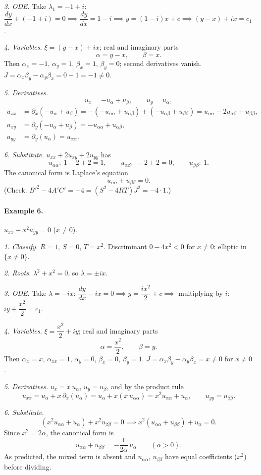 \documentclass[11pt]{article}
\theoremstyle{plain}
\theoremstyle{definition}
\theoremstyle{remark}
\begin{document}
\emph{3. ODE.} Take $\lambda_1 = -1 + i$: $\dfrac{dy}{dx} + (-1 + i) = 0 \implies \dfrac{dy}{dx} = 1 - i \implies y = (1 - i)x + c \implies (y - x) + ix = c_1$.

\emph{4. Variables.} $\xi = (y - x) + ix$; real and imaginary parts
$$ \alpha = y - x, \qquad \beta = x. $$
Then $\alpha_x = -1$, $\alpha_y = 1$, $\beta_x = 1$, $\beta_y = 0$; second derivatives vanish. $J = \alpha_x\beta_y - \alpha_y\beta_x = 0 - 1 = -1 \neq 0$.

\emph{5. Derivatives.}
$$ u_x = -u_\alpha + u_\beta, \qquad u_y = u_\alpha, $$
\begin{align*}
u_{xx} &= \partial_x(-u_\alpha + u_\beta) = -(-u_{\alpha\alpha} + u_{\alpha\beta}) + (-u_{\alpha\beta} + u_{\beta\beta}) = u_{\alpha\alpha} - 2u_{\alpha\beta} + u_{\beta\beta}, \\
u_{xy} &= \partial_y(-u_\alpha + u_\beta) = -u_{\alpha\alpha} + u_{\alpha\beta}, \\
u_{yy} &= \partial_y(u_\alpha) = u_{\alpha\alpha}.
\end{align*}

\emph{6. Substitute.} $u_{xx} + 2u_{xy} + 2u_{yy}$ has
$$ u_{\alpha\alpha}: \ 1 - 2 + 2 = 1, \qquad u_{\alpha\beta}: \ -2 + 2 = 0, \qquad u_{\beta\beta}: \ 1. $$
The canonical form is Laplace's equation
$$ u_{\alpha\alpha} + u_{\beta\beta} = 0. $$
(Check: $B'^2 - 4A'C' = -4 = (S^2 - 4RT)J^2 = -4\cdot 1$.)

\paragraph{Example 6.} $u_{xx} + x^2u_{yy} = 0$ \quad ($x \neq 0$).

\emph{1. Classify.} $R = 1$, $S = 0$, $T = x^2$. Discriminant $0 - 4x^2 < 0$ for $x \neq 0$: elliptic in $\{x \neq 0\}$.

\emph{2. Roots.} $\lambda^2 + x^2 = 0$, so $\lambda = \pm ix$.

\emph{3. ODE.} Take $\lambda = -ix$: $\dfrac{dy}{dx} - ix = 0 \implies y = \dfrac{ix^2}{2} + c \implies$ multiplying by $i$: $iy + \dfrac{x^2}{2} = c_1$.

\emph{4. Variables.} $\xi = \dfrac{x^2}{2} + iy$; real and imaginary parts
$$ \alpha = \frac{x^2}{2}, \qquad \beta = y. $$
Then $\alpha_x = x$, $\alpha_{xx} = 1$, $\alpha_y = 0$, $\beta_x = 0$, $\beta_y = 1$. $J = \alpha_x\beta_y - \alpha_y\beta_x = x \neq 0$ for $x \neq 0$.

\emph{5. Derivatives.} $u_x = x\,u_\alpha$, $u_y = u_\beta$, and by the product rule
$$ u_{xx} = u_\alpha + x\,\partial_x(u_\alpha) = u_\alpha + x(x\,u_{\alpha\alpha}) = x^2u_{\alpha\alpha} + u_\alpha, \qquad u_{yy} = u_{\beta\beta}. $$

\emph{6. Substitute.}
$$ (x^2u_{\alpha\alpha} + u_\alpha) + x^2u_{\beta\beta} = 0 \implies x^2(u_{\alpha\alpha} + u_{\beta\beta}) + u_\alpha = 0. $$
Since $x^2 = 2\alpha$, the canonical form is
$$ u_{\alpha\alpha} + u_{\beta\beta} = -\frac{1}{2\alpha}\,u_\alpha \qquad (\alpha > 0). $$
As predicted, the mixed term is absent and $u_{\alpha\alpha}$, $u_{\beta\beta}$ have equal coefficients ($x^2$) before dividing.
\end{document}
